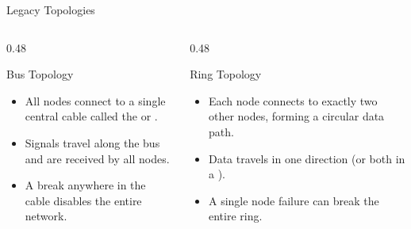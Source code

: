 \documentclass[aspectratio=169]{beamer}  %
\begin{document}
\begin{frame}{Legacy Topologies}
    \begin{columns}[T]
        \begin{column}{0.48\textwidth}
            \begin{block}{Bus Topology}
                \begin{itemize}
                    \item All nodes connect to a single central cable called the  or .
                    \item Signals travel along the bus and are received by all nodes.
                    \item A break anywhere in the cable disables the entire network.
                \end{itemize}
            \end{block}
            \begin{center}
            \end{center}
        \end{column}
        \begin{column}{0.48\textwidth}
            \begin{block}{Ring Topology}
                \begin{itemize}
                    \item Each node connects to exactly two other nodes, forming a circular data path.
                    \item Data travels in one direction (or both in a ).
                    \item A single node failure can break the entire ring.
                \end{itemize}
            \end{block}
            \begin{center}

\end{center}
\end{column}
\end{columns}
\end{frame}
\end{document}
